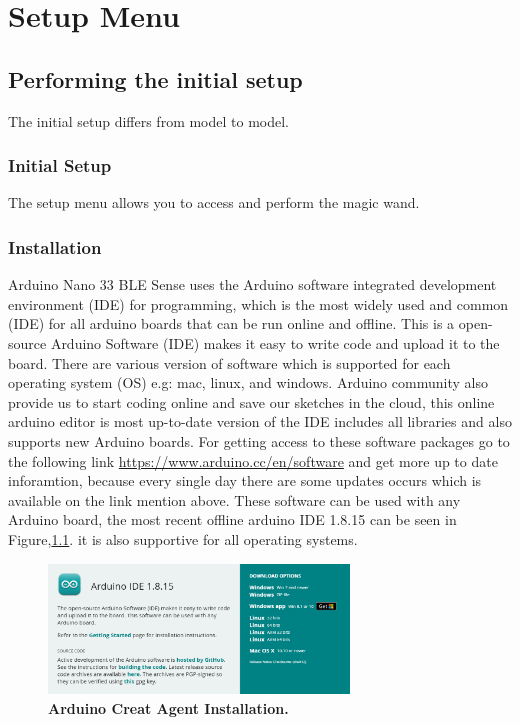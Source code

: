 %
%



\chapter{Setup Menu}\label{Setup}

\section{Performing the initial setup}

The initial setup differs from model to model.

\subsection{Initial Setup}
The setup menu allows you to access and perform the magic wand.

\subsection{Installation}
Arduino Nano 33 BLE Sense uses the Arduino software integrated development environment (IDE) for programming, which is the most widely used and common (IDE) for all arduino boards that can be run online and offline. This is a open-source Arduino Software (IDE) makes it easy to write code and upload it to the board. There are various version of software which is supported for each operating system (OS) e.g: mac, linux, and windows. Arduino community also provide us to start coding online and save our sketches in the cloud, this online arduino editor is most up-to-date version of the IDE includes all libraries and also supports new Arduino boards. For getting access to these software packages go to the following link \url{https://www.arduino.cc/en/software}  and get more up to date inforamtion, because every single day there are some updates occurs which is available on the link mention above. These software can be used with any Arduino board, the most recent offline arduino IDE 1.8.15 can be seen in Figure,\ref{fig:Arduino Creat Agent Installation}. it is also supportive for all operating systems.


\begin{figure}[h]\centering
	\includegraphics[width=8cm]{Images/SoftwareDescription/Arduino Creat Agent Installation}
	\caption{\textbf{Arduino Creat Agent Installation.}}
	\label{fig:Arduino Creat Agent Installation}		
\end{figure}

